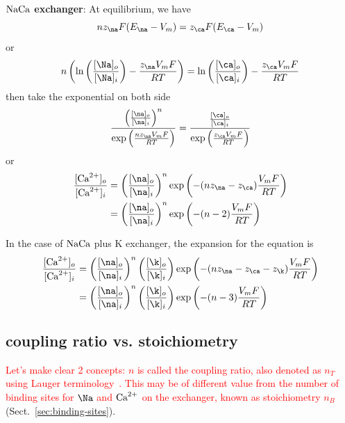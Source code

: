 {\bf ${\text{NaCa}}$ exchanger}: At equilibrium, we have
\begin{equation}
  \label{eq:1162}
  n z_\na F(E_\na-V_m) = z_\ca F(E_\ca-V_m)  
\end{equation}
or
\begin{equation}
  \label{eq:1173}
  n \left(\ln\left(\frac{[\Na]_o}{[\Na]_i}\right) - \frac{z_\na
      V_mF}{RT}\right) = 
  \ln\left(\frac{[\ca]_o}{[\ca]_i}\right) - \frac{z_\ca V_mF}{RT}
\end{equation}
then take the exponential on both side
\begin{equation}
  \label{eq:1172}
  \frac{\left(\frac{[\na]_o}{[\na]_i}\right)^n}{\exp\left(\frac{nz_\na
        V_mF}{RT}\right)} =   \frac{\frac{[\ca]_o}{[\ca]_i}}{\exp\left(\frac{z_\ca
        V_mF}{RT}\right)}
\end{equation}
 or
\begin{equation}
  \label{eq:1171}
  \begin{split}
    \frac{[\Ca]_o}{[\Ca]_i} &= \left(\frac{[\na]_o}{[\na]_i}\right)^n 
    \exp\left( -(nz_\na-z_\ca)\frac{V_mF}{RT} \right) \\
    &=\left(\frac{[\na]_o}{[\na]_i}\right)^n 
    \exp\left( -(n-2)\frac{V_mF}{RT} \right) 
  \end{split}
\end{equation}

\begin{framed}
  In the case of ${\text{NaCa}}$ plus K exchanger, the expansion for the
  equation is
  \begin{equation}
    \label{eq:1174}
    \begin{split}
      \frac{[\Ca]_o}{[\Ca]_i} &= \left(\frac{[\na]_o}{[\na]_i}\right)^n 
      \left(\frac{[\k]_o}{[\k]_i}\right)
      \exp\left( -(nz_\na-z_\ca-z_\k)\frac{V_mF}{RT} \right)    \\
      &= \left(\frac{[\na]_o}{[\na]_i}\right)^n 
      \left(\frac{[\k]_o}{[\k]_i}\right)
      \exp\left( -(n-3)\frac{V_mF}{RT} \right)    
    \end{split}
  \end{equation}
\end{framed}

\subsection{coupling ratio vs. stoichiometry}

\textcolor{red}{Let's make clear 2 concepts: $n$ is called the
  coupling ratio, also denoted as $n_T$ using Lauger
  terminology~\citep{lauger1991}. This may be of different value from
  the number of binding sites for $\Na$ and ${\text{Ca}^{2+}}$ on the exchanger,
  known as stoichiometry $n_B$}
(Sect.~\ref{sec:binding-sites}).  


